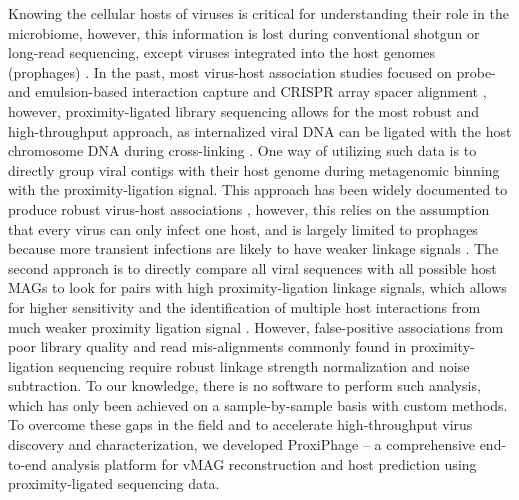 Knowing the cellular hosts of viruses is critical for understanding their role in the microbiome, however, this information is lost during conventional shotgun or long-read sequencing, except viruses integrated into the host genomes (prophages) \cite{RN2982}. In the past, most virus-host association studies focused on probe- and emulsion-based interaction capture \cite{RN2985} and CRISPR array spacer alignment \cite{RN2980}, however, proximity-ligated library sequencing allows for the most robust and high-throughput approach, as internalized viral DNA can be ligated with the host chromosome DNA during cross-linking \cite{RN2980}. One way of utilizing such data is to directly group viral contigs with their host genome during metagenomic binning with the proximity-ligation signal. This approach has been widely documented to produce robust virus-host associations \cite{RN72, RN16}, however, this relies on the assumption that every virus can only infect one host, and is largely limited to prophages because more transient infections are likely to have weaker linkage signals \cite{RN2975}. The second approach is to directly compare all viral sequences with all possible host MAGs to look for pairs with high proximity-ligation linkage signals, which allows for higher sensitivity and the identification of multiple host interactions from much weaker proximity ligation signal \cite{RN2984, RN15}. However, false-positive associations from poor library quality and read mis-alignments commonly found in proximity-ligation sequencing require robust linkage strength normalization and noise subtraction. To our knowledge, there is no software to perform such analysis, which has only been achieved on a sample-by-sample basis with custom methods. To overcome these gaps in the field and to accelerate high-throughput virus discovery and characterization, we developed ProxiPhage – a comprehensive end-to-end analysis platform for vMAG reconstruction and host prediction using proximity-ligated sequencing data. 


